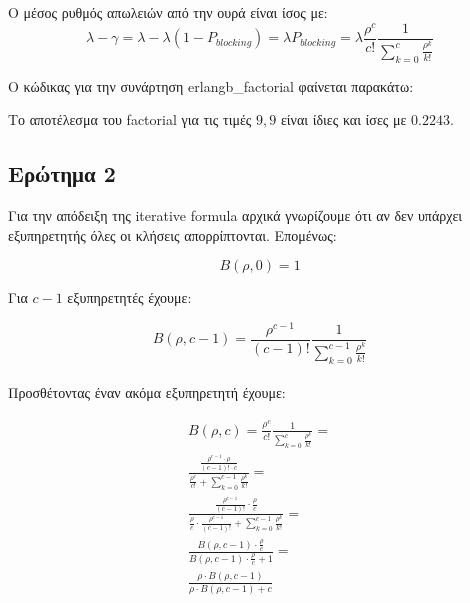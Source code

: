 \documentclass[12pt]{article}
\begin{document}
Ο μέσος ρυθμός απωλειών από την ουρά είναι ίσος με:
\begin{equation}
    \lambda - \gamma = \lambda - \lambda (1 - P_{blocking}) = \lambda P_{blocking} = \lambda \frac {\rho^c}{c!} \frac{1}{\sum_{k=0}^{c} \frac{\rho^k}{k!}}
\end{equation}

Ο κώδικας για την συνάρτηση erlangb\_factorial φαίνεται παρακάτω:



Το αποτέλεσμα του factorial για τις τιμές $9,9$ είναι ίδιες και ίσες με $0.2243$.

\subsection{Ερώτημα 2}
Για την απόδειξη της iterative formula αρχικά γνωρίζουμε ότι αν δεν υπάρχει 
εξυπηρετητής όλες οι κλήσεις απορρίπτονται. Επομένως:

\begin{equation}
    B(\rho,0) = 1
\end{equation}

Για $c - 1$ εξυπηρετητές έχουμε:

\begin{equation}
    B(\rho,c-1) = \frac{\rho^{c-1}}{(c-1)!} \frac{1}{\sum_{k=0}^{c-1} \frac{\rho^k}{k!}}
\end{equation}
\\

Προσθέτοντας έναν ακόμα εξυπηρετητή έχουμε:

\begin{align*}
    Β(\rho,c) = \frac{\rho^c}{c!} \frac{1}{\sum_{k=0}^{c} \frac{\rho^k}{k!}} = \\
    \frac{\frac{\rho^{c-1}\cdot \rho}{(c-1)! \cdot c}}{\frac{\rho^c}{c!} + \sum_{k=0}^{c-1} \frac{\rho^k}{k!}} = \\
    \frac{\frac{\rho^{c-1}}{(c-1)!} \cdot \frac{\rho}{c}}{\frac{\rho}{c} \cdot \frac{\rho^{c-1}}{(c-1)!} + \sum_{k=0}^{c-1} \frac{\rho^k}{k!}} = \\
    \frac{B(\rho,c-1) \cdot \frac{\rho}{c}}{B(\rho,c-1) \cdot \frac{\rho}{c} + 1} = \\
    \frac{\rho \cdot B(\rho,c-1)}{\rho \cdot B(\rho,c-1) + c}
\end{align*}
\\
\end{document}
